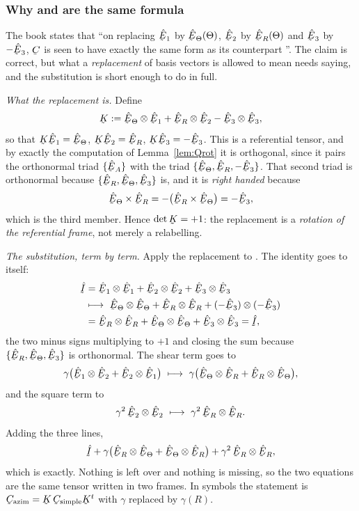\subsubsection*{Why  and  are the same formula}

The book states that ``on replacing $\hbE_{1}$ by $\hETh(\Theta)$,
$\hbE_{2}$ by $\hER(\Theta)$ and $\hbE_{3}$ by $-\hbE_{3}$, $\bC$ is seen
to have exactly the same form as its counterpart ''. The claim is
correct, but what a \emph{replacement} of basis vectors is allowed to mean
needs saying, and the substitution is short enough to do in full.

\smallskip\noindent
\emph{What the replacement is.} Define
\[
   \bK:=\hETh\otimes\hbE_{1}+\hER\otimes\hbE_{2}
        -\hbE_{3}\otimes\hbE_{3},
\]
so that $\bK\hbE_{1}=\hETh$, $\bK\hbE_{2}=\hER$,
$\bK\hbE_{3}=-\hbE_{3}$. This is a referential tensor, and by exactly the
computation of Lemma~\ref{lem:Qrot} it is orthogonal, since it pairs the
orthonormal triad $\{\hbE_{A}\}$ with the triad
$\{\hETh,\hER,-\hbE_{3}\}$. That second triad is orthonormal because
$\{\hER,\hETh,\hbE_{3}\}$ is, and it is \emph{right handed} because
\[
   \hETh\times\hER=-\big(\hER\times\hETh\big)=-\hbE_{3},
\]
which is the third member. Hence $\det\bK=+1$: the replacement is a
\emph{rotation of the referential frame}, not merely a relabelling.

\smallskip\noindent
\emph{The substitution, term by term.} Apply the replacement to .
The identity goes to itself:
\[
\begin{aligned}
   \hI&=\hbE_{1}\otimes\hbE_{1}+\hbE_{2}\otimes\hbE_{2}
      +\hbE_{3}\otimes\hbE_{3}\\
   &\longmapsto\ \hETh\otimes\hETh+\hER\otimes\hER
      +(-\hbE_{3})\otimes(-\hbE_{3})\\
   &=\hER\otimes\hER+\hETh\otimes\hETh+\hbE_{3}\otimes\hbE_{3}=\hI ,
\end{aligned}
\]
the two minus signs multiplying to $+1$ and  closing the sum
because $\{\hER,\hETh,\hbE_{3}\}$ is orthonormal. The shear term goes to
\[
   \gamma\big(\hbE_{1}\otimes\hbE_{2}+\hbE_{2}\otimes\hbE_{1}\big)
   \ \longmapsto\
   \gamma\big(\hETh\otimes\hER+\hER\otimes\hETh\big),
\]
and the square term to
\[
   \gamma^{2}\,\hbE_{2}\otimes\hbE_{2}
   \ \longmapsto\ \gamma^{2}\,\hER\otimes\hER .
\]
Adding the three lines,
\[
   \hI+\gamma\big(\hER\otimes\hETh+\hETh\otimes\hER\big)
     +\gamma^{2}\,\hER\otimes\hER ,
\]
which is  exactly. Nothing is left over and nothing is missing, so
the two equations are the same tensor written in two frames. In symbols
the statement is $\bC_{\text{azim}}=\bK\,\bC_{\text{simple}}\bK^{t}$ with
$\gamma$ replaced by $\gamma(R)$.

